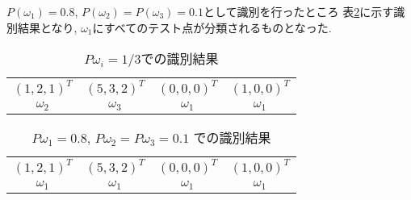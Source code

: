 $P(\omega_1)=0.8$, $P(\omega_2)=P(\omega_3)=0.1$として識別を行ったところ
表\ref{tbl:prob-discrimination-2}に示す識別結果となり,
$\omega_1$にすべてのテスト点が分類されるものとなった.

\begin{table}[htbp]
  \begin{center}
    \begin{tabular}{cccc}
      $(1, 2, 1)^T$ & $(5, 3, 2)^T$ & $(0, 0, 0)^T$ & $(1, 0, 0)^T$ \\
      $\omega_2$ & $\omega_3$ & $\omega_1$ & $\omega_1$
    \end{tabular}
    \caption{$P{\omega_i}=1/3$での識別結果}
    \label{tbl:prob-discrimination-1}
  \end{center}
\end{table}

\begin{table}[htbp]
  \begin{center}
    \begin{tabular}{cccc}
      $(1, 2, 1)^T$ & $(5, 3, 2)^T$ & $(0, 0, 0)^T$ & $(1, 0, 0)^T$ \\
      $\omega_1$ & $\omega_1$ & $\omega_1$ & $\omega_1$
    \end{tabular}
    \caption{$P{\omega_1}=0.8$, $P{\omega_2}=P{\omega_3}=0.1$ での識別結果}
    \label{tbl:prob-discrimination-2}
  \end{center}
\end{table}

